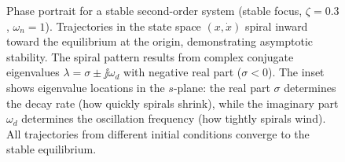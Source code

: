 \begin{figure}[htbp]
\caption{Phase portrait for a stable second-order system (stable focus, $\zeta = 0.3$, $\omega_n = 1$). Trajectories in the state space $(x, \dot{x})$ spiral inward toward the equilibrium at the origin, demonstrating asymptotic stability. The spiral pattern results from complex conjugate eigenvalues $\lambda = \sigma \pm \jj\omega_d$ with negative real part ($\sigma < 0$). The inset shows eigenvalue locations in the $s$-plane: the real part $\sigma$ determines the decay rate (how quickly spirals shrink), while the imaginary part $\omega_d$ determines the oscillation frequency (how tightly spirals wind). All trajectories from different initial conditions converge to the stable equilibrium.}
\label{fig:phase_portrait}
\end{figure}
